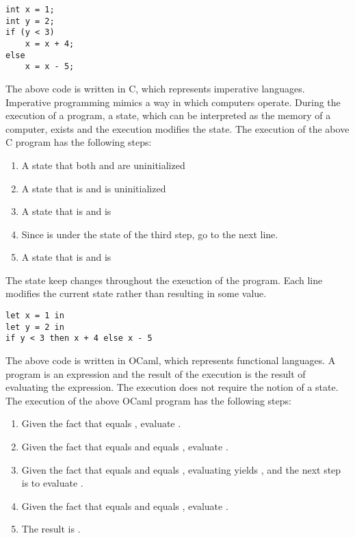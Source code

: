 \begin{verbatim}
int x = 1;
int y = 2;
if (y < 3)
    x = x + 4;
else
    x = x - 5;
\end{verbatim}

The above code is written in C, which represents imperative languages. Imperative
programming mimics a way in which computers operate. During the execution of a
program, a state, which can be interpreted as the memory of a computer,
exists and the execution modifies the state. The execution of the above C program has
the following steps:

\begin{enumerate}
\item A state that both  and  are uninitialized
\item A state that  is  and  is uninitialized
\item A state that  is  and  is 
\item Since  is  under the state of the third step, go to
the next line.
\item A state that  is  and  is 
\end{enumerate}

The state keep changes throughout the exeuction of the program. Each line
modifies the current state rather than resulting in some value.

\begin{verbatim}
let x = 1 in
let y = 2 in
if y < 3 then x + 4 else x - 5
\end{verbatim}

The above code is written in OCaml, which represents functional languages. A
program is an expression and the result of the execution is the result of
evaluating the expression. The execution does not require the notion of a state.
The execution of the above OCaml program has the following steps:

\begin{enumerate}
\item Given the fact that  equals , evaluate
.
\item Given the fact that  equals  and  equals ,
evaluate .
\item Given the fact that  equals  and  equals ,
evaluating  yields , and the next step is to evaluate
.
\item Given the fact that  equals  and  equals ,
evaluate .
\item The result is .
\end{enumerate}

